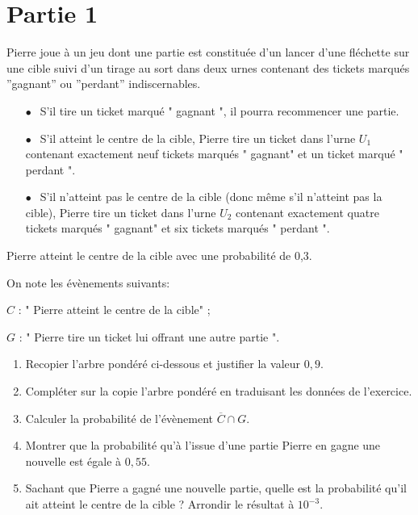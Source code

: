 \documentclass[11pt]{article}
\begin{document}
\section{Partie 1}

 \begin{exercice}[3][]
 \medskip

Pierre joue à un jeu dont une partie est constituée d'un lancer d'une fléchette sur une cible suivi d'un tirage au sort dans deux urnes contenant des tickets marqués ''gagnant'' ou
''perdant'' indiscernables.

\setlength\parindent{8mm}
\begin{itemize}
\item[$\bullet~~$] S'il tire un ticket marqué " gagnant ", il pourra recommencer une partie.
\item[$\bullet~~$] S'il atteint le centre de la cible, Pierre tire un ticket dans l'urne $U_1$ contenant exactement neuf tickets marqués " gagnant" et un ticket marqué " perdant ".
\item[$\bullet~~$] S'il n'atteint pas le centre de la cible (donc même s'il n'atteint pas la cible), Pierre tire un ticket dans l'urne $U_2$ contenant exactement quatre tickets marqués " gagnant" et six tickets marqués " perdant ".
\end{itemize}
\setlength\parindent{0mm}

\smallskip

Pierre atteint le centre de la cible avec une probabilité de 0,3.

\smallskip
On note les évènements suivants:

\qquad $C$ : " Pierre atteint le centre de la cible" ;

\qquad $G$ : " Pierre tire un ticket lui offrant une autre partie ".

\medskip

\begin{enumerate}
\item Recopier l'arbre pondéré ci-dessous et justifier la valeur $0,9$.



\item Compléter sur la copie l'arbre pondéré en traduisant les données de l'exercice.
\item Calculer la probabilité de l'évènement $\overline{C} \cap G$.
\item Montrer que la probabilité qu'à l'issue d'une partie Pierre en gagne une nouvelle est égale à $0,55$.
\item Sachant que Pierre a gagné une nouvelle partie, quelle est la probabilité qu'il ait atteint le centre de la cible ? Arrondir le résultat à $10^{-3}$.
\end{enumerate}
 \end{exercice}
\end{document}

